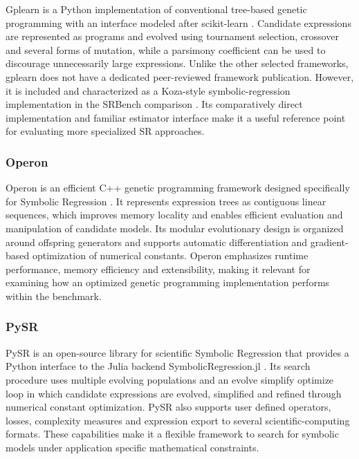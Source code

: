 \documentclass[12pt,oneside,bibtotoc,liststotoc]{scrbook}
\begin{document}
Gplearn is a Python implementation of conventional tree-based genetic programming with an interface modeled after scikit-learn \cite{stephens2026gplearn}. Candidate expressions are represented as programs and evolved using tournament selection, crossover and several forms of mutation, while a parsimony coefficient can be used to discourage unnecessarily large expressions. Unlike the other selected frameworks, gplearn does not have a dedicated peer-reviewed framework publication. However, it is included and characterized as a Koza-style symbolic-regression implementation in the SRBench comparison \cite{lacava2021contemporary}. Its comparatively direct implementation and familiar estimator interface make it a useful reference point for evaluating more specialized SR approaches.

\subsubsection{Operon}

Operon is an efficient C++ genetic programming framework designed specifically for Symbolic Regression \cite{burlacu2020operon}. It represents expression trees as contiguous linear sequences, which improves memory locality and enables efficient evaluation and manipulation of candidate models. Its modular evolutionary design is organized around offspring generators and supports automatic differentiation and gradient-based optimization of numerical constants. Operon emphasizes runtime performance, memory efficiency and extensibility, making it relevant for examining how an optimized genetic programming implementation performs within the benchmark.

\subsubsection{PySR}

PySR is an open-source library for scientific Symbolic Regression that provides a Python interface to the Julia backend SymbolicRegression.jl \cite{cranmer2023interpretable}. Its search procedure uses multiple evolving populations and an evolve simplify optimize loop in which candidate expressions are evolved, simplified and refined through numerical constant optimization. PySR also supports user defined operators, losses, complexity measures and expression export to several scientific-computing formats. These capabilities make it a flexible framework to search for symbolic models under application specific mathematical constraints.
\end{document}
